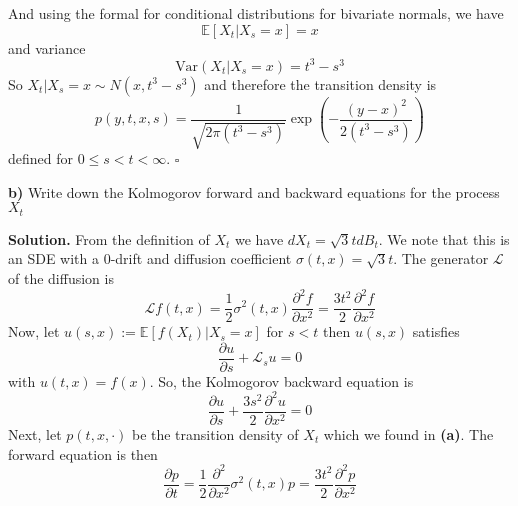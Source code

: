 \documentclass{article}
\begin{document}
And using the formal for conditional distributions for bivariate normals, we have 
$$\mathbb{E}[X_t|X_s=x] = x$$
and variance 
$$\text{Var}(X_t | X_s=x) = t^3-s^3$$
So $X_t|X_s=x\sim N(x,t^3-s^3)$ and therefore the transition density is 
$$p(y,t,x,s) = \frac{1}{\sqrt{2\pi(t^3-s^3)}}\exp\left(-\frac{(y-x)^2}{2(t^3-s^3)}\right)$$
defined for $0\leq s < t<\infty$. $\square$

\begin{tcolorbox}
[colframe=black,colback=gray!5,boxrule=0.5pt]
    \textbf{b)} Write down the Kolmogorov forward and backward equations for the process $X_t$
\end{tcolorbox}
\textbf{Solution.} From the definition of $X_t$ we have $dX_t = \sqrt{3}tdB_t$. We note that this is an SDE with a 0-drift and diffusion coefficient $\sigma(t,x) = \sqrt{3}t$. The generator $\mathcal{L}$ of the diffusion is 
$$\mathcal{L}f(t,x) = \frac{1}{2}\sigma^2(t,x)\frac{\partial^2 f}{\partial x^2} = \frac{3t^2}{2}\frac{\partial^2 f}{\partial x^2}$$
Now, let $u(s,x):=\mathbb{E}[f(X_t) | X_s=x]$ for $s<t$ then $u(s,x)$ satisfies 
$$\frac{\partial u}{\partial s}+\mathcal{L}_su = 0$$
with $u(t,x) = f(x)$. So, the Kolmogorov backward equation is 
$$\frac{\partial u}{\partial s} + \frac{3s^2}{2}\frac{\partial^2 u}{\partial x^2}=0$$
Next, let $p(t,x,\cdot)$ be the transition density of $X_t$ which we found in \textbf{(a)}. The forward equation is then 
$$\frac{\partial p}{\partial t} = \frac{1}{2}\frac{\partial^2}{\partial x^2}\sigma^2(t,x) p = \frac{3t^2}{2}\frac{\partial^2p}{\partial x^2}$$
\end{document}
